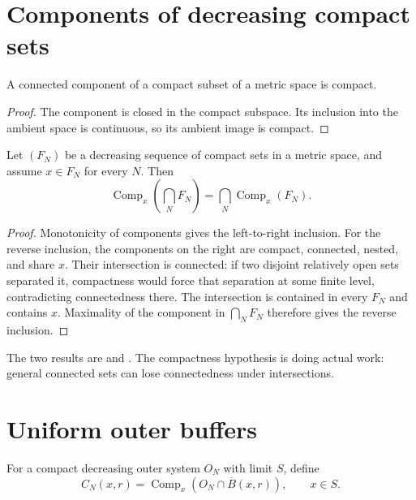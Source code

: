 \section{Components of decreasing compact sets}

\begin{lemma}
A connected component of a compact subset of a metric space is compact.
\end{lemma}

\begin{proof}
The component is closed in the compact subspace.  Its inclusion into the
ambient space is continuous, so its ambient image is compact.
\end{proof}

\begin{theorem}
\label{thm:component-intersection}
Let $(F_N)$ be a decreasing sequence of compact sets in a metric space,
and assume $x\in F_N$ for every $N$.  Then
\[
 \operatorname{Comp}_x\left(\bigcap_N F_N\right)
     =\bigcap_N\operatorname{Comp}_x(F_N).
\]
\end{theorem}

\begin{proof}
Monotonicity of components gives the left-to-right inclusion.
For the reverse inclusion, the components on the right are compact,
connected, nested, and share $x$.  Their intersection is connected:
if two disjoint relatively open sets separated it, compactness would
force that separation at some finite level, contradicting connectedness
there.  The intersection is contained in every $F_N$ and contains $x$.
Maximality of the component in $\bigcap_N F_N$ therefore gives the
reverse inclusion.
\end{proof}

The two results are
and
.
The compactness hypothesis is doing actual work: general connected sets
can lose connectedness under intersections.

\section{Uniform outer buffers}

For a compact decreasing outer system $O_N$ with limit $S$, define
\[
 C_N(x,r)=\operatorname{Comp}_x
                  (O_N\cap\overline B(x,r)),\qquad x\in S.
\]

